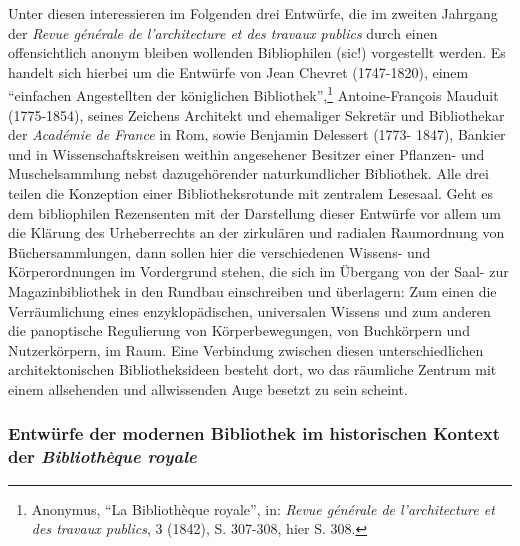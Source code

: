 Unter diesen interessieren im Folgenden drei Entwürfe, die im zweiten
Jahrgang der \emph{Revue générale de l'architecture et des travaux
publics} durch einen offensichtlich anonym bleiben wollenden
Bibliophilen (sic!) vorgestellt werden. Es handelt sich hierbei um die
Entwürfe von Jean Chevret (1747-1820), einem \enquote{einfachen
Angestellten der königlichen Bibliothek},\footnote{Anonymus, \enquote{La
  Bibliothèque royale}, in: \emph{Revue générale de l'architecture et
  des travaux publics}, 3 (1842), S. 307-308, hier S. 308.}
Antoine-François Mauduit (1775-1854), seines Zeichens Architekt und
ehemaliger Sekretär und Bibliothekar der \emph{Académie de France} in
Rom, sowie Benjamin Delessert (1773- 1847), Bankier und in
Wissenschaftskreisen weithin angesehener Besitzer einer Pflanzen- und
Muschelsammlung nebst dazugehörender naturkundlicher Bibliothek. Alle
drei teilen die Konzeption einer Bibliotheksrotunde mit zentralem
Lesesaal. Geht es dem bibliophilen Rezensenten mit der Darstellung
dieser Entwürfe vor allem um die Klärung des Urheberrechts an der
zirkulären und radialen Raumordnung von Büchersammlungen, dann sollen
hier die verschiedenen Wissens- und Körperordnungen im Vordergrund
stehen, die sich im Übergang von der Saal- zur Magazinbibliothek in den
Rundbau einschreiben und überlagern: Zum einen die Verräumlichung eines
enzyklopädischen, universalen Wissens und zum anderen die panoptische
Regulierung von Körperbewegungen, von Buchkörpern und Nutzerkörpern, im
Raum. Eine Verbindung zwischen diesen unterschiedlichen
architektonischen Bibliotheksideen besteht dort, wo das räumliche
Zentrum mit einem allsehenden und allwissenden Auge besetzt zu sein
scheint.

\subsubsection{Entwürfe der modernen Bibliothek im
historischen Kontext der \emph{Bibliothèque
royale}}

